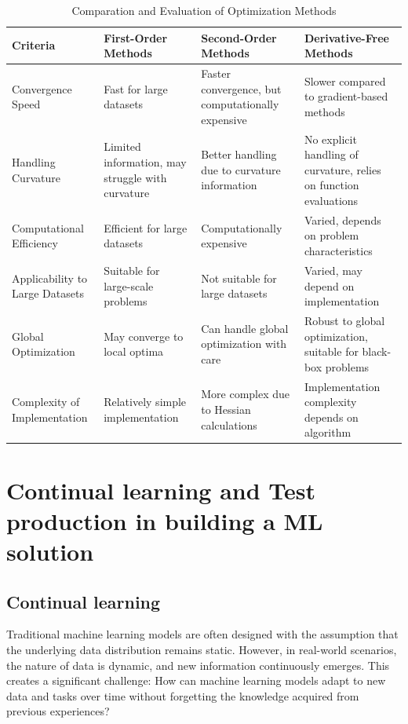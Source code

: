 \documentclass[12pt,a4paper]{article}
\begin{document}
\begin{table}[h]
	\centering
	\caption{Comparation and Evaluation of Optimization Methods}
	\begin{tabular}{|>{\raggedright}p{2.5cm} |>{\raggedright}p{3.5cm} |>{\raggedright}p{3.5cm} |>{\raggedright\arraybackslash}p{3.5cm}|}
		\hline
		Criteria & First-Order Methods & Second-Order Methods & Derivative-Free Methods \\
		\hline
		Convergence Speed & Fast for large datasets & Faster convergence, but computationally expensive & Slower compared to gradient-based methods \\
		\hline
		Handling Curvature & Limited information, may struggle with curvature & Better handling due to curvature information & No explicit handling of curvature, relies on function evaluations \\
		\hline
		Computational Efficiency & Efficient for large datasets & Computationally expensive & Varied, depends on problem characteristics \\
		\hline
		Applicability to Large Datasets & Suitable for large-scale problems & Not suitable for large datasets & Varied, may depend on implementation \\
		\hline
		Global Optimization & May converge to local optima & Can handle global optimization with care & Robust to global optimization, suitable for black-box problems \\
		\hline
		Complexity of Implementation & Relatively simple implementation & More complex due to Hessian calculations & Implementation complexity depends on algorithm \\
		\hline
	\end{tabular}
	\label{Tab:evaluation}
\end{table}

\section{Continual learning and Test production in building a ML solution}
\subsection{Continual learning}
Traditional machine learning models are often designed with the assumption that the underlying data distribution remains static. However, in real-world scenarios, the nature of data is dynamic, and new information continuously emerges. This creates a significant challenge: How can machine learning models adapt to new data and tasks over time without forgetting the knowledge acquired from previous experiences?
\end{document}
